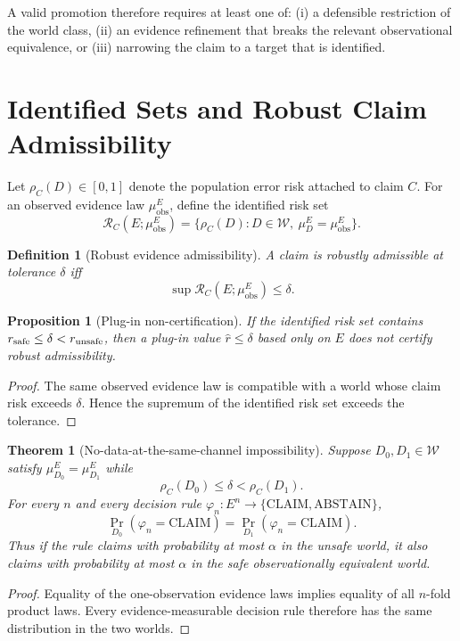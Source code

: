 \documentclass[11pt]{article}
\newtheorem{theorem}{Theorem}
\newtheorem{proposition}{Proposition}
\newtheorem{definition}{Definition}
\begin{document}
A valid promotion therefore requires at least one of: (i) a defensible
restriction of the world class, (ii) an evidence refinement that breaks the
relevant observational equivalence, or (iii) narrowing the claim to a target
that is identified.

\section{Identified Sets and Robust Claim Admissibility}
\label{sec:identified}

Let $\rho_C(D)\in[0,1]$ denote the population error risk attached to claim
$C$. For an observed evidence law $\mu_{\mathrm{obs}}^E$, define the
identified risk set
\[
\mathcal R_C(E;\mu_{\mathrm{obs}}^E)
=
\{\rho_C(D):D\in\mathcal W,\ \mu_D^E=\mu_{\mathrm{obs}}^E\}.
\]

\begin{definition}[Robust evidence admissibility]
A claim is robustly admissible at tolerance $\delta$ iff
\[
\sup \mathcal R_C(E;\mu_{\mathrm{obs}}^E)\le\delta.
\]
\end{definition}

\begin{proposition}[Plug-in non-certification]
If the identified risk set contains
$r_{\rm safe}\le\delta<r_{\rm unsafe}$, then a plug-in value
$\hat r\le\delta$ based only on $E$ does not certify robust admissibility.
\end{proposition}

\begin{proof}
The same observed evidence law is compatible with a world whose claim risk
exceeds $\delta$. Hence the supremum of the identified risk set exceeds the
tolerance.
\end{proof}

\begin{theorem}[No-data-at-the-same-channel impossibility]
\label{thm:no-data}
Suppose $D_0,D_1\in\mathcal W$ satisfy
$\mu_{D_0}^{E}=\mu_{D_1}^{E}$ while
\[
\rho_C(D_0)\le\delta<\rho_C(D_1).
\]
For every $n$ and every decision rule
$\varphi_n:E^n\to\{\mathrm{CLAIM},\mathrm{ABSTAIN}\}$,
\[
\Pr_{D_0}(\varphi_n=\mathrm{CLAIM})
=
\Pr_{D_1}(\varphi_n=\mathrm{CLAIM}).
\]
Thus if the rule claims with probability at most $\alpha$ in the unsafe world,
it also claims with probability at most $\alpha$ in the safe observationally
equivalent world.
\end{theorem}

\begin{proof}
Equality of the one-observation evidence laws implies equality of all
$n$-fold product laws. Every evidence-measurable decision rule therefore has
the same distribution in the two worlds.
\end{proof}
\end{document}
